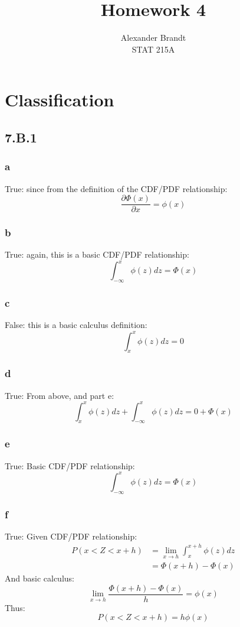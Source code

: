 \documentclass{article}\usepackage[]{graphicx}\usepackage[]{color}
\begin{document}
\title{Homework 4}

\author{Alexander Brandt\\STAT 215A}

\maketitle

\section{Classification}

\subsection*{7.B.1}

\subsubsection*{a}

True: since from the definition of the CDF/PDF relationship:
\[\frac{\partial \Phi(x)}{\partial x} = \phi(x) \]
\subsubsection*{b}
True: again, this is a basic CDF/PDF relationship:
\[ \int_{-\infty}^{x} \phi(z) dz = \Phi(x) \]
\subsubsection*{c}
False: this is a basic calculus definition:
\[ \int_{x}^{x} \phi(z) dz = 0 \]
\subsubsection*{d}
True: From above, and part e:
\[ \int_{x}^{x} \phi(z) dz + \int_{-\infty}^{x} \phi(z) dz = 0 + \Phi(x)\]
\subsubsection*{e}
True:  Basic CDF/PDF relationship:
\[ \int_{-\infty}^{x} \phi(z) dz = \Phi(x) \]
\subsubsection*{f}
True:  Given CDF/PDF relationship:
\begin{align*}
P( x < Z < x+h) &= \lim_{x \to h} \int_{x}^{x+h} \phi(z) dz \\
&= \Phi(x+h) - \Phi(x)
\end{align*}
And basic calculus:
\[\lim_{x \to h} \frac{\Phi(x+h) - \Phi(x)}{h} = \phi(x) \]
Thus:
\[P( x < Z < x+h) = h \phi(x) \]
\end{document}
